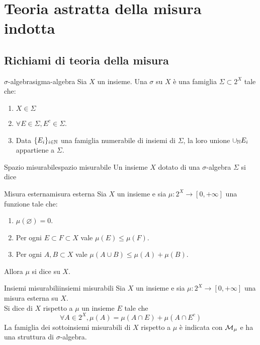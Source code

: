 \documentclass{article}
\begin{document}
\section{Teoria astratta della misura indotta}

\subsection{Richiami di teoria della misura}

\begin{definition}{$\sigma$-algebra}{sigma-algebra}
    Sia $X$ un insieme. Una $\sigma$ su $X$ è una famiglia $\Sigma \subset 2^X$ tale che:\begin{enumerate}
        \item $X \in \Sigma$
        \item $\forall E \in \Sigma, E^c \in \Sigma$.
        \item Data $\{E_i\}_{i \in \mathbb{N}}$ una famiglia numerabile di insiemi di $\Sigma$, la loro unione $\cup_{\mathbb{N}} E_i$ appartiene a $\Sigma$.
    \end{enumerate}
\end{definition}

\begin{definition}{Spazio misurabile}{spazio misurabile}
    Un insieme $X$ dotato di una $\sigma$-algebra $\Sigma$ si dice 
\end{definition}

\begin{definition}{Misura esterna}{misura esterna}
    Sia $X$ un insieme e sia $\mu : 2^X\to [0, +\infty]$ una funzione tale che:\begin{enumerate}
        \item $\mu(\varnothing) = 0$.
        \item Per ogni $E \subset F \subset X$ vale $\mu(E)\le\mu(F)$.
        \item Per ogni $A,B \subset X$ vale $\mu(A\cup B) \le \mu(A) + \mu(B)$.
    \end{enumerate}
    Allora $\mu$ si dice  su $X$.
\end{definition}

\begin{definition}{Insiemi misurabili}{insiemi misurabili}
    Sia $X$ un insieme e sia $\mu: 2^X\to[0, + \infty]$ una misura esterna su $X$.\\
    Si dice  di $X$ rispetto a $\mu$ un insieme $E$ tale che
    \[\forall A \in 2^X, \mu(A) = \mu(A \cap E) + \mu(A\cap E^c)\]
    La famiglia dei sottoinsiemi misurabili di $X$ rispetto a $\mu$ è indicata con $\mathcal{M}_\mu$ e ha una struttura di $\sigma$-algebra.
\end{definition}
\end{document}
